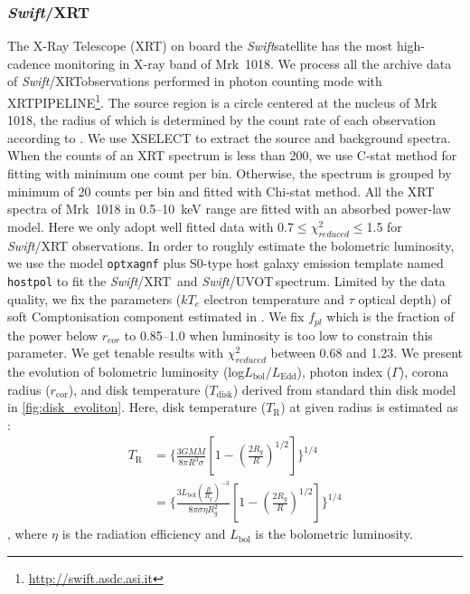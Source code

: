 \documentclass[twocolumn]{aastex63}
\newcommand{\swift}{{\small \it Swift}}
\newcommand{\xrt}{{\small {\it Swift}/XRT}}
\newcommand{\uvot}{{\small {\it Swift}/UVOT}}
\begin{document}
\subsubsection{\xrt}
\label{data-xrt}
The X-Ray Telescope (XRT) on board the \swift satellite has the most high-cadence monitoring in X-ray band of Mrk~1018. We process all the archive data of \xrt observations performed in photon counting mode with {\scriptsize XRTPIPELINE}\footnote{\url{http://swift.asdc.asi.it}}. The source region is a circle centered at the nucleus of Mrk 1018, the radius of which is determined by the count rate of each observation according to \citet{2009MNRAS.397.1177E}. We use {\scriptsize XSELECT} to extract the source and background spectra. When the counts of an XRT spectrum is less than 200, we use C-stat method for fitting with minimum one count per bin. Otherwise, the spectrum is grouped by minimum of 20 counts per bin and fitted with Chi-stat method. All the XRT spectra of Mrk~1018 in 0.5--10~keV range are fitted with an absorbed power-law model. Here we only adopt well fitted data with 0.7$\le \chi^2_{reduced} \le$1.5 for \swift/XRT observations. In order to roughly estimate the bolometric luminosity, we use the model \texttt{optxagnf} plus S0-type host galaxy
emission template named \texttt{hostpol} \citep{2007ApJ...663...81P} to fit the \xrt\, and \uvot \,spectrum. Limited by the data quality, we fix the parameters ($kT_e$ electron temperature and $\tau$ optical depth) of soft Comptonisation component estimated in \citep{2018MNRAS.480.3898N}. We fix $f_{pl}$ which is the fraction of the power below $r_{cor}$ to 0.85--1.0 when luminosity is too low to constrain this parameter. We get tenable results with $\chi^2_{reduced}$ between 0.68 and 1.23. We present the evolution of bolometric luminosity (log$L_\mathrm{bol}/L_\mathrm{Edd}$), photon index ($\Gamma$), corona radius ($r_\mathrm{cor}$), and disk temperature ($T_\mathrm{disk}$) derived from standard thin disk model in \autoref{fig:disk_evoliton}. Here,  disk temperature ($T_\mathrm{R}$) at given radius is estimated as :
\begin{equation}
\begin{aligned}
    T_\mathrm{R} & = \{\frac{3GM\dot{M}}{8\pi R^3 \sigma}[1-(\frac{2 R_g}{R})^{1/2}]\}^{1/4} \\ & = \{\frac{3 L_\mathrm{bol} (\frac{R}{R_g})^{-3}}{8\pi \sigma \eta R_g^2}[1-(\frac{2 R_g}{R})^{1/2}]\}^{1/4}
\end{aligned}
\end{equation}, where $\eta$ is the radiation efficiency and $L_\mathrm{bol}$ is the bolometric luminosity.
\end{document}
